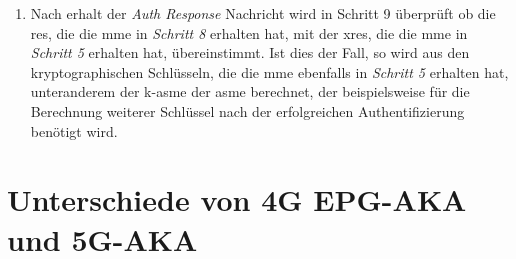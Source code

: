 \begin{enumerate}
\item Nach erhalt der \textit{Auth Response} Nachricht wird in Schritt 9 überprüft ob die \gls{res}, die die \gls{mme} in \textit{Schritt 8} erhalten hat, mit der \gls{xres}, die die \gls{mme} in \textit{Schritt 5} erhalten hat, übereinstimmt.
Ist dies der Fall, so wird aus den kryptographischen Schlüsseln, die die \gls{mme} ebenfalls in \textit{Schritt 5} erhalten hat, unteranderem der \gls{k-asme} der \gls{asme} berechnet, der beispielsweise für die Berechnung weiterer Schlüssel nach der erfolgreichen Authentifizierung benötigt wird.%
\end{enumerate}


\section{Unterschiede von 4G EPG-AKA und 5G-AKA}
